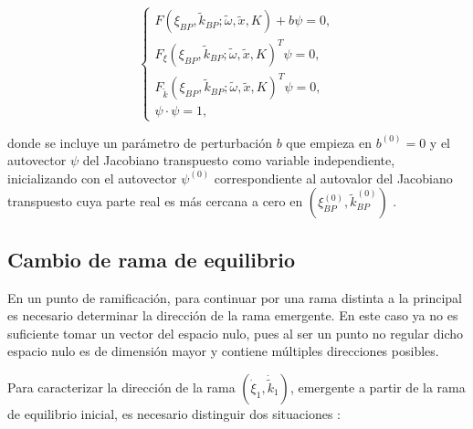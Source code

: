 \begin{equation}
    \begin{cases}
        F(\xi_{BP}, \tilde{k}_{BP}; \tilde{\omega}, \tilde{x}, K) + b \psi = 0,             \\[1mm]
        F_{\xi}(\xi_{BP}, \tilde{k}_{BP}; \tilde{\omega}, \tilde{x}, K)^{T} \psi = 0,       \\[1mm]
        F_{\tilde{k}}(\xi_{BP}, \tilde{k}_{BP}; \tilde{\omega}, \tilde{x}, K)^{T} \psi = 0, \\[1mm]
        \psi \cdot \psi = 1,
    \end{cases}
    \label{eq:System_bp}
\end{equation}

donde se incluye un parámetro de perturbación $ b $ que empieza en $ b^{(0)} = 0 $
y el autovector $ \psi $ del Jacobiano transpuesto como variable independiente,
inicializando con el autovector $ \psi^{(0)} $ correspondiente al autovalor del
Jacobiano transpuesto cuya parte real es más cercana a cero en $ ( \xi_{BP}^{(0)}, \tilde{k}_{BP}^{(0)} ) $  \cite{Meijer2011}.

\subsection{Cambio de rama de equilibrio}

En un punto de ramificación, para continuar por una rama distinta a la principal es
necesario determinar la dirección de la rama emergente. En este caso ya no es suficiente
tomar un vector del espacio nulo, pues al ser un punto no regular dicho espacio nulo es
de dimensión mayor y contiene múltiples direcciones posibles.

Para caracterizar la dirección de la rama
\((\dot{\xi}_1, \dot{\tilde{k}}_1)\), emergente a partir de la rama de equilibrio inicial,
es necesario distinguir dos situaciones \cite{Meijer2011}:

